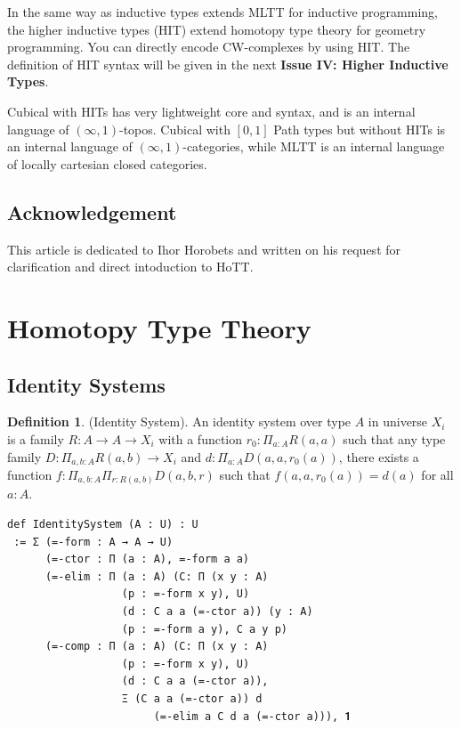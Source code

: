 \documentclass{article}
\theoremstyle{definition}
\newtheorem{definition}{Definition}
\begin{document}
In the same way as inductive types extends MLTT for inductive programming,
the higher inductive types (HIT) extend homotopy type theory for geometry programming.
You can directly encode CW-complexes by using HIT. The definition of HIT syntax will
be given in the next {\bf Issue IV: Higher Inductive Types}.

Cubical with HITs has very lightweight core and syntax, and
is an internal language of $(\infty,1)$-topos.
Cubical with $[0,1]$ Path types but without HITs is an
internal language of $(\infty,1)$-categories, while MLTT
is an internal language of locally cartesian closed categories.

\subsection*{Acknowledgement}
This article is dedicated to Ihor Horobets and written on his
request for clarification and direct intoduction to HoTT.

\newpage
\section{Homotopy Type Theory}

\subsection{Identity Systems}
\begin{definition} (Identity System).
An identity system over type $A$ in universe $X_i$ is a
family $R : A \rightarrow A \rightarrow X_i$ with a function
$r_0: \Pi_{a:A}R(a,a)$ such that any type family
$D : \Pi_{a,b:A}R(a,b) \rightarrow X_i$ and
$d: \Pi_{a:A}D(a,a,r_0(a))$, there exists a function
$f: \Pi_{a,b:A}\Pi_{r:R(a,b)}D(a,b,r)$ such that
$f(a,a,r_0(a))=d(a)$ for all $a:A$.
\begin{lstlisting}
def IdentitySystem (A : U) : U
 := Σ (=-form : A → A → U)
      (=-ctor : Π (a : A), =-form a a)
      (=-elim : Π (a : A) (C: Π (x y : A)
                  (p : =-form x y), U)
                  (d : C a a (=-ctor a)) (y : A)
                  (p : =-form a y), C a y p)
      (=-comp : Π (a : A) (C: Π (x y : A)
                  (p : =-form x y), U)
                  (d : C a a (=-ctor a)),
                  Ξ (C a a (=-ctor a)) d
                       (=-elim a C d a (=-ctor a))), 𝟏
\end{lstlisting}
\end{definition}
\end{document}
